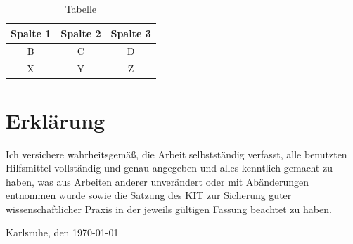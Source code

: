 \documentclass[12pt]{scrartcl}
\begin{document}
\begin{table}[h]
	\centering
	\begin{tabular}{|c|c|c|} \hline
		Spalte 1 & Spalte 2 & Spalte 3 \\ \hline \hline
		B & C & D \\ \hline
		X & Y & Z \\ \hline
	\end{tabular}
	\caption{Tabelle}
\end{table}




\newpage


\pagestyle{plain}
\listoffigures








\newpage

\printbibliography[heading=bibintoc,title={Literaturverzeichnis}]
\pagestyle{plain}

\newpage

\section*{Erklärung}

Ich versichere wahrheitsgemäß, die Arbeit selbstständig verfasst, alle benutzten Hilfsmittel vollständig und genau angegeben und alles kenntlich gemacht zu haben, was aus Arbeiten anderer unverändert oder mit Abänderungen entnommen wurde sowie die Satzung des KIT zur Sicherung guter wissenschaftlicher Praxis in der jeweils gültigen Fassung beachtet zu haben.

\vspace{3cm}

\hspace{0.5cm} Karlsruhe, den \today
\end{document}
